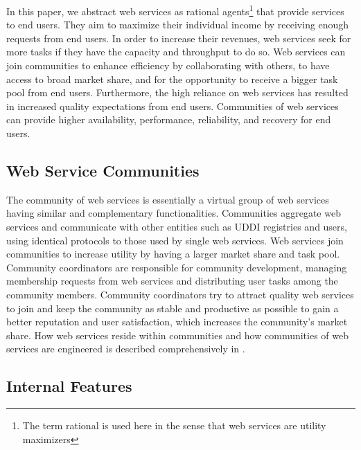 \documentclass[10pt,journal,cspaper,compsoc]{IEEEtran}
\begin{document}
In this paper, we abstract web services as rational agents\footnote{The term rational is used here in the sense that web services are utility maximizers} that provide services to end users. They aim to maximize their individual income  by receiving enough requests from end users. In order to increase their revenues, web services seek for more tasks if they have the capacity and throughput to do so. Web services can join communities to enhance efficiency by collaborating with others, to have access to broad market share, and for the opportunity to receive a bigger task pool from end users. Furthermore, the high reliance on web services has resulted in increased quality expectations from end users. Communities of web services can provide higher availability, performance, reliability, and recovery for end users.

\subsection{Web Service Communities}\label{s:wsc}

The community of web services is essentially a virtual group of web services having similar and complementary functionalities. Communities aggregate web services and communicate with other entities such as UDDI registries and users, using identical protocols to those used by single web services. Web services join communities to increase utility by having a larger market share and task pool. Community coordinators are responsible for community development, managing membership requests from web services and distributing user tasks among the community members. Community coordinators try to attract quality web services to join and keep the community as stable and productive as possible to gain a better reputation and user satisfaction, which increases the community's market share. How web services reside within communities and how communities of web services are engineered is described comprehensively in \cite{DBLP:journals/ijebr/MaamarSTBB09}.


\subsection{Internal Features}\label{s:if}
\end{document}
